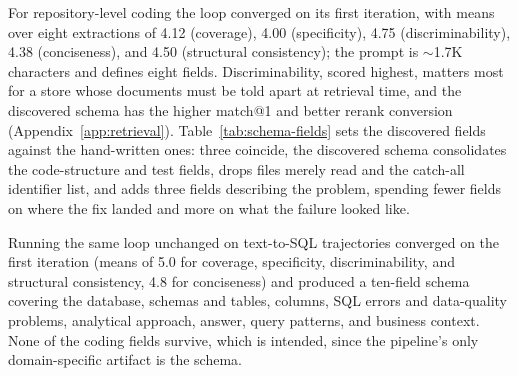 \documentclass{article}
\begin{document}
For repository-level coding the loop converged on its first iteration, with means over eight extractions of 4.12 (coverage), 4.00 (specificity), 4.75 (discriminability), 4.38 (conciseness), and 4.50 (structural consistency); the prompt is $\sim$1.7K characters and defines eight fields. Discriminability, scored highest, matters most for a store whose documents must be told apart at retrieval time, and the discovered schema has the higher match@1 and better rerank conversion (Appendix~\ref{app:retrieval}). Table~\ref{tab:schema-fields} sets the discovered fields against the hand-written ones: three coincide, the discovered schema consolidates the code-structure and test fields, drops files merely read and the catch-all identifier list, and adds three fields describing the problem, spending fewer fields on where the fix landed and more on what the failure looked like.

\begin{table}[h]
\begin{center}
\end{center}
\caption{Extraction fields, hand-written against discovered, for repository-level coding. Rows pair fields serving the same purpose; the last two list fields present in only one schema.}
\label{tab:schema-fields}
\end{table}

Running the same loop unchanged on text-to-SQL trajectories converged on the first iteration (means of 5.0 for coverage, specificity, discriminability, and structural consistency, 4.8 for conciseness) and produced a ten-field schema covering the database, schemas and tables, columns, SQL errors and data-quality problems, analytical approach, answer, query patterns, and business context. None of the coding fields survive, which is intended, since the pipeline's only domain-specific artifact is the schema.
\end{document}
